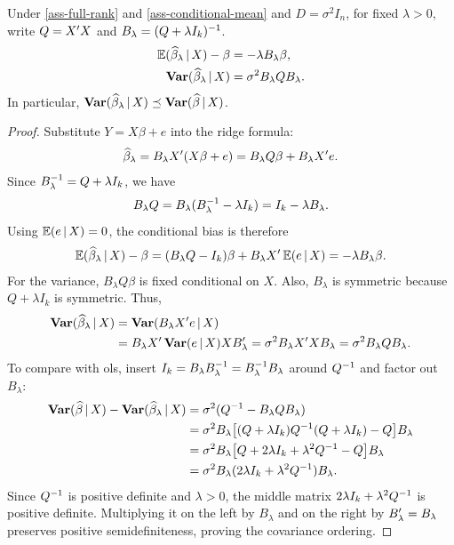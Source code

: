 \documentclass[a4paper,12pt]{article}
\begin{document}
\begin{proposition}\label{prop-ridge}
	Under \autoref{ass-full-rank} and \autoref{ass-conditional-mean} and $D=\sigma^2 I_n$, for fixed $\lambda>0$,
	write $Q=X^{\prime} X$ and $B_\lambda=(Q+\lambda I_k)^{-1}$.
	\begin{align}
		\operatorname{\mathbb{E}}(\widehat\beta_\lambda\mathpunct{}|\mathpunct{} X)-\beta
		&=-\lambda B_\lambda\beta,\\
		\operatorname{\text{\textrm{\upshape\textbf{Var}}}}(\widehat\beta_\lambda\mathpunct{}|\mathpunct{} X)
		&=\sigma^2B_\lambda Q B_\lambda.
	\end{align}
	In particular,
	$\operatorname{\text{\textrm{\upshape\textbf{Var}}}}(\widehat\beta_\lambda\mathpunct{}|\mathpunct{} X)\preceq\operatorname{\text{\textrm{\upshape\textbf{Var}}}}(\widehat\beta\mathpunct{}|\mathpunct{} X)$.
\end{proposition}
\begin{proof}
	Substitute $Y=X\beta+e$ into the ridge formula:
	\begin{align*}
		\widehat\beta_\lambda
		=B_\lambda X^{\prime}(X\beta+e)
		=B_\lambda Q\beta+B_\lambda X^{\prime} e.
	\end{align*}
	Since $B_\lambda^{-1}=Q+\lambda I_k$, we have
	\begin{align*}
		B_\lambda Q
		=B_\lambda(B_\lambda^{-1}-\lambda I_k)
		=I_k-\lambda B_\lambda.
	\end{align*}
	Using $\operatorname{\mathbb{E}}(e\mathpunct{}|\mathpunct{} X)=0$, the conditional bias is therefore
	\begin{align*}
		\operatorname{\mathbb{E}}(\widehat\beta_\lambda\mathpunct{}|\mathpunct{} X)-\beta
		=(B_\lambda Q-I_k)\beta+B_\lambda X^{\prime}\operatorname{\mathbb{E}}(e\mathpunct{}|\mathpunct{} X)
		=-\lambda B_\lambda\beta.
	\end{align*}
	For the variance, $B_\lambda Q\beta$ is fixed conditional on $X$.
	Also, $B_\lambda$ is symmetric because $Q+\lambda I_k$ is symmetric.
	Thus,
	\begin{align*}
		\operatorname{\text{\textrm{\upshape\textbf{Var}}}}(\widehat\beta_\lambda\mathpunct{}|\mathpunct{} X)
		&=\operatorname{\text{\textrm{\upshape\textbf{Var}}}}(B_\lambda X^{\prime} e\mathpunct{}|\mathpunct{} X)\\
		&=B_\lambda X^{\prime}\operatorname{\text{\textrm{\upshape\textbf{Var}}}}(e\mathpunct{}|\mathpunct{} X)X B_\lambda^{\prime}
		=\sigma^2B_\lambda X^{\prime} X B_\lambda
		=\sigma^2B_\lambda Q B_\lambda.
	\end{align*}
	To compare with \gls{ols}, insert $I_k=B_\lambda B_\lambda^{-1}=B_\lambda^{-1} B_\lambda$ around $Q^{-1}$ and factor out $B_\lambda$:
	\begin{align*}
		\operatorname{\text{\textrm{\upshape\textbf{Var}}}}(\widehat\beta\mathpunct{}|\mathpunct{} X)-\operatorname{\text{\textrm{\upshape\textbf{Var}}}}(\widehat\beta_\lambda\mathpunct{}|\mathpunct{} X)
		&=\sigma^2(Q^{-1}-B_\lambda Q B_\lambda)\\
		&=\sigma^2B_\lambda\big[(Q+\lambda I_k)Q^{-1}(Q+\lambda I_k)-Q\big]B_\lambda\\
		&=\sigma^2B_\lambda\big[Q+2\lambda I_k+\lambda^2Q^{-1}-Q\big]B_\lambda\\
		&=\sigma^2B_\lambda(2\lambda I_k+\lambda^2Q^{-1})B_\lambda.
	\end{align*}
	Since $Q^{-1}$ is positive definite and $\lambda>0$, the middle matrix $2\lambda I_k+\lambda^2Q^{-1}$ is positive definite.
	Multiplying it on the left by $B_\lambda$ and on the right by $B_\lambda^{\prime}=B_\lambda$ preserves positive semidefiniteness,
	proving the covariance ordering.
\end{proof}
\end{document}
